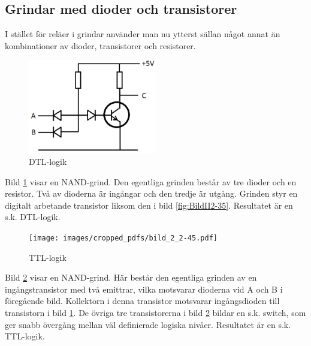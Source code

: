 \subsection{Grindar med dioder och transistorer}

I stället för reläer i grindar använder man nu ytterst sällan något annat än
kombinationer av dioder, transistorer och resistorer.

\begin{figure}
\includegraphics[width=0.5\textwidth]{images/cropped_pdfs/bild_2_2-44.pdf}
\caption{DTL-logik}
\label{fig:BildII2-44}
\end{figure}

Bild \ref{fig:BildII2-44} visar en NAND-grind.
Den egentliga grinden består av tre dioder och en resistor.
Två av dioderna är ingångar och den tredje är utgång.
Grinden styr en digitalt arbetande transistor liksom den i bild
\ref{fig:BildII2-35}.
Resultatet är en s.k. DTL-logik.

\begin{figure}
\texttt{[image: images/cropped\_pdfs/bild\_2\_2-45.pdf]}
\caption{TTL-logik}
\label{fig:BildII2-45}
\end{figure}

Bild \ref{fig:BildII2-45} visar en NAND-grind.
Här består den egentliga grinden av en ingångstransistor med två emittrar,
vilka motsvarar dioderna vid A och B i föregående bild.
Kollektorn i denna transistor motsvarar ingångsdioden till transistorn i bild
\ref{fig:BildII2-44}.
De övriga tre transistorerna i bild \ref{fig:BildII2-45} bildar en s.k. switch,
som ger snabb övergång mellan väl definierade logiska nivåer.
Resultatet är en s.k. TTL-logik.
